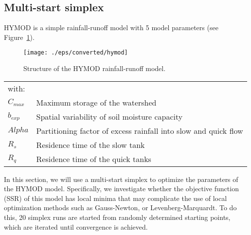 






\subsection{Multi-start simplex}

HYMOD \citep{boyl-gupt-soro2000} is a simple rainfall-runoff model with 5 model parameters (see Figure~\ref{fig:hymod}).

\begin{figure}[htbp]
  \centering
    \texttt{[image: ./eps/converted/hymod]}
  \caption{Structure of the HYMOD rainfall-runoff model.}
  \label{fig:hymod}
\end{figure}
\begin{tabular}{ll}
with:&\\
$C_{max}$&Maximum storage of the watershed\\
$b_{exp}$&Spatial variability of soil moisture capacity\\
$Alpha$&Partitioning factor of excess rainfall into slow and quick flow\\
$R_{s}$&Residence time of the slow tank\\
$R_{q}$&Residence time of the quick tanks\\
\end{tabular}

In this section, we will use a multi-start simplex \citep{neld-mead1965} to optimize the parameters of the HYMOD model. Specifically, we investigate whether the objective function (SSR) of this model has local minima that may complicate the use of local optimization methods such as Gauss-Newton, or Levenberg-Marquardt. To do this, 20 simplex runs are started from randomly determined starting points, which are iterated until convergence is achieved.

